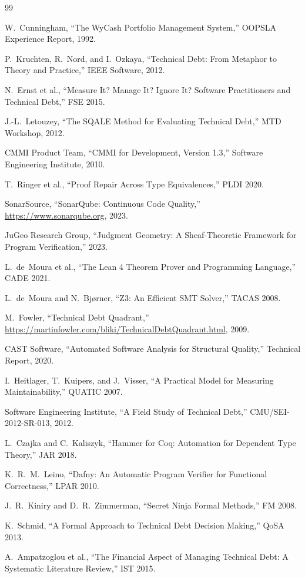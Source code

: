 \documentclass[11pt]{article}
\begin{document}
\begin{thebibliography}{99}

W.~Cunningham, ``The WyCash Portfolio Management System,''
OOPSLA Experience Report, 1992.

P.~Kruchten, R.~Nord, and I.~Ozkaya, ``Technical Debt: From Metaphor
to Theory and Practice,'' IEEE Software, 2012.

N.~Ernst et al., ``Measure It? Manage It? Ignore It? Software
Practitioners and Technical Debt,'' FSE 2015.

J.-L.~Letouzey, ``The SQALE Method for Evaluating Technical Debt,''
MTD Workshop, 2012.

CMMI Product Team, ``CMMI for Development, Version 1.3,''
Software Engineering Institute, 2010.

T.~Ringer et al., ``Proof Repair Across Type Equivalences,''
PLDI 2020.

SonarSource, ``SonarQube: Continuous Code Quality,''
\url{https://www.sonarqube.org}, 2023.

JuGeo Research Group, ``Judgment Geometry: A Sheaf-Theoretic Framework
for Program Verification,'' 2023.

L.~de~Moura et al., ``The Lean 4 Theorem Prover and Programming
Language,'' CADE 2021.

L.~de~Moura and N.~Bj{\o}rner, ``Z3: An Efficient SMT Solver,''
TACAS 2008.


M.~Fowler, ``Technical Debt Quadrant,''
\url{https://martinfowler.com/bliki/TechnicalDebtQuadrant.html}, 2009.

CAST Software, ``Automated Software Analysis for Structural Quality,''
Technical Report, 2020.

I.~Heitlager, T.~Kuipers, and J.~Visser, ``A Practical Model for
Measuring Maintainability,'' QUATIC 2007.

Software Engineering Institute, ``A Field Study of Technical Debt,''
CMU/SEI-2012-SR-013, 2012.

L.~Czajka and C.~Kaliszyk, ``Hammer for Coq: Automation for
Dependent Type Theory,'' JAR 2018.

K.~R.~M.~Leino, ``Dafny: An Automatic Program Verifier for
Functional Correctness,'' LPAR 2010.

J.~R.~Kiniry and D.~R.~Zimmerman, ``Secret Ninja Formal Methods,''
FM 2008.

K.~Schmid, ``A Formal Approach to Technical Debt Decision Making,''
QoSA 2013.

A.~Ampatzoglou et al., ``The Financial Aspect of Managing Technical
Debt: A Systematic Literature Review,'' IST 2015.

\end{thebibliography}
\end{document}
